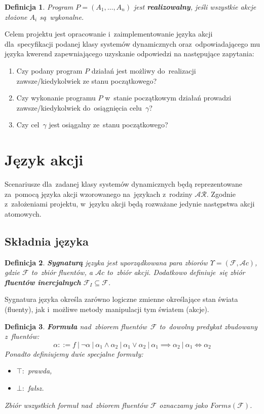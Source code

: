 \documentclass[11pt,a4paper]{article}
\newtheorem{defn}{Definicja}
\begin{document}
\begin{defn}
    Program $P = (A_1, \dots, A_n)$ jest \textbf{realizowalny}, jeśli wszystkie akcje złożone $A_i$ są~wykonalne.
\end{defn}

Celem projektu jest opracowanie i~zaimplementowanie języka akcji dla~specyfikacji podanej klasy systemów dynamicznych oraz~odpowiadającego mu języka kwerend zapewniającego uzyskanie odpowiedzi na następujące zapytania:

\begin{enumerate}
    \item Czy podany program $P$ działań jest możliwy do~realizacji zawsze/kiedykolwiek ze stanu początkowego?
    \item Czy wykonanie programu $P$ w~stanie początkowym działań prowadzi zawsze/kiedykolwiek do~osiągnięcia celu~$\gamma$?
    \item Czy cel~$\gamma$ jest osiągalny ze~stanu początkowego?
\end{enumerate}

\section{Język akcji}

Scenariusze dla~zadanej klasy systemów dynamicznych będą reprezentowane za~pomocą języka akcji wzorowanego na~językach z~rodziny $\mathcal{AR}$.
Zgodnie z~założeniami projektu, w~języku akcji będą rozważane jedynie następstwa akcji atomowych.

\subsection{Składnia języka}

\begin{defn}
    \textbf{Sygnaturą} języka jest uporządkowana para zbiorów $\Upsilon = (\mathcal{F}, \mathcal{A}c)$, gdzie $\mathcal{F}$ to~zbiór fluentów, a $ \mathcal{A}c$ to~zbiór akcji.
    Dodatkowo definiuje~się zbiór \textbf{fluentów inercjalnych} $\mathcal{F}_I \subseteq \mathcal{F}$.
\end{defn}

Sygnatura języka określa zarówno logiczne zmienne określające stan świata (fluenty), jak i~możliwe metody manipulacji tym światem (akcje).

\begin{defn}
    \textbf{Formuła} nad~zbiorem fluentów~$\mathcal{F}$ to~dowolny predykat zbudowany z~fluentów: 
    $$ \alpha ::= f\ |\ \neg\alpha\ |\ \alpha_1 \land \alpha_2\ |\ \alpha_1 \lor \alpha_2\ |\ \alpha_1 \implies \alpha_2\ |\ \alpha_1 \iff \alpha_2 $$
    Ponadto definiujemy dwie specjalne formuły:
    
    \begin{itemize}
    \item $\top\colon$ prawda,
    
    \item $\bot\colon$ fałsz.
    \end{itemize}
    
    Zbiór wszystkich formuł nad~zbiorem fluentów $\mathcal{F}$ oznaczamy jako $Forms(\mathcal{F})$.
\end{defn}
\end{document}
